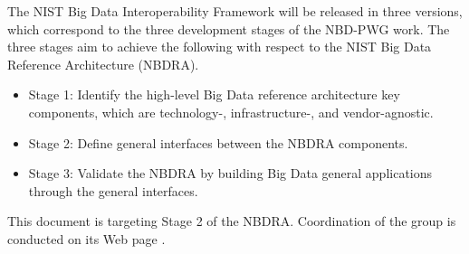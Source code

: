 The NIST Big Data Interoperability Framework will be released in three
versions, which correspond to the three development stages of the
NBD-PWG work. The three stages aim to achieve the following with
respect to the NIST Big Data Reference Architecture (NBDRA).

\begin{itemize}
\item Stage 1: Identify the high-level Big Data reference architecture
  key components, which are technology-, infrastructure-, and
  vendor-agnostic.
\item Stage 2: Define general interfaces between the NBDRA components.
\item Stage 3: Validate the NBDRA by building Big Data general
  applications through the general interfaces.
\end{itemize}

This document is targeting Stage 2 of the NBDRA. Coordination of the
group is conducted on its Web page \cite{www-nbdwg}. 